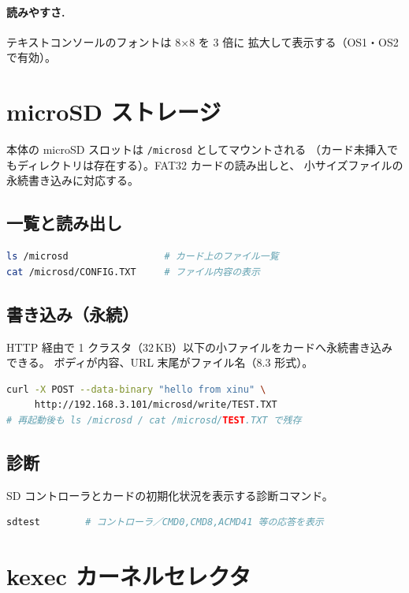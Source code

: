 \documentclass[a4paper,11pt]{ltjsarticle}
\begin{document}
\paragraph{読みやすさ.} テキストコンソールのフォントは 8$\times$8 を 3 倍に
拡大して表示する（OS1・OS2 で有効）。

\section{microSD ストレージ}
\label{sec:storage}

本体の microSD スロットは \texttt{/microsd} としてマウントされる
（カード未挿入でもディレクトリは存在する）。FAT32 カードの読み出しと、
小サイズファイルの永続書き込みに対応する。

\subsection{一覧と読み出し}
\begin{lstlisting}[language=bash]
ls /microsd                 # カード上のファイル一覧
cat /microsd/CONFIG.TXT     # ファイル内容の表示
\end{lstlisting}

\subsection{書き込み（永続）}
HTTP 経由で 1 クラスタ（32\,KB）以下の小ファイルをカードへ永続書き込みできる。
ボディが内容、URL 末尾がファイル名（8.3 形式）。

\begin{lstlisting}[language=bash]
curl -X POST --data-binary "hello from xinu" \
     http://192.168.3.101/microsd/write/TEST.TXT
# 再起動後も ls /microsd / cat /microsd/TEST.TXT で残存
\end{lstlisting}

\subsection{診断}
SD コントローラとカードの初期化状況を表示する診断コマンド。
\begin{lstlisting}[language=bash]
sdtest        # コントローラ／CMD0,CMD8,ACMD41 等の応答を表示
\end{lstlisting}

\section{kexec カーネルセレクタ}
\label{sec:kexec}
\end{document}
